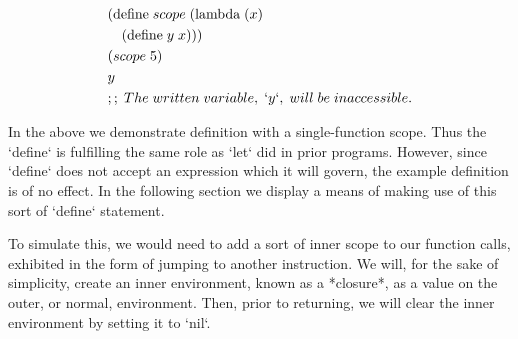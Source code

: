 \begin{align*}
& (\text{define} \; scope \; (\text{lambda} \; (x)
\\& \quad (\text{define} \; y \; x)))
\\& (scope \; 5)
\\& y
\\& ;; \; The \; written \; variable, \; `y`, \; will \; be \; inaccessible.
\end{align*}

In the above we demonstrate definition with a single-function scope. Thus the 
`define` is fulfilling the same role as `let` did in prior programs. However, since 
`define` does not accept an expression which it will govern, the example definition 
is of no effect. In the following section we display a means of making use of this 
sort of `define` statement.

To simulate this, we would need to add a sort of inner scope to our function calls, 
exhibited in the form of jumping to another instruction. We will, for the sake of
simplicity, create an inner environment, known as a *closure*, as a value on the
outer, or normal, environment. Then, prior to returning, we will clear the inner 
environment by setting it to `nil`.

